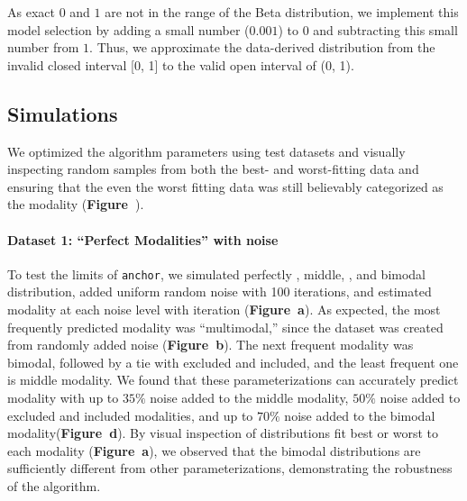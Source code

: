 \clearpage



As exact $0$ and $1$ are not in the range of the Beta distribution, we implement this model selection by adding a small number ($0.001$) to $0$ and subtracting this small number from $1$. Thus, we approximate the data-derived distribution from the invalid closed interval [0, 1] to the valid open interval of (0, 1).


\subsection{Simulations}

We optimized the algorithm parameters using test datasets and visually inspecting random samples from both the best- and worst-fitting data and ensuring that the even the worst fitting data was still believably categorized as the modality (\textbf{Figure~}).

\paragraph{Dataset 1: ``Perfect Modalities'' with noise}
\label{sec:anchor_perfect_modalities}

To test the limits of \texttt{anchor}, we simulated perfectly \0, middle, \1, and bimodal distribution, added uniform random noise with 100 iterations, and estimated modality at each noise level with iteration (\textbf{Figure~a}). As expected, the most frequently predicted modality was ``multimodal,'' since the dataset was created from randomly added noise (\textbf{Figure~b}). The next frequent modality was bimodal, followed by a tie with excluded and included, and the least frequent one is middle modality. We found that these parameterizations can accurately predict modality with up to $35\%$ noise added to the middle modality, $50\%$ noise added to excluded and included modalities, and up to $70\%$ noise added to the bimodal modality(\textbf{Figure~d}). By visual inspection of distributions fit best or worst to each modality (\textbf{Figure~a}), we observed that the bimodal distributions are sufficiently different from other parameterizations, demonstrating the robustness of the algorithm.



